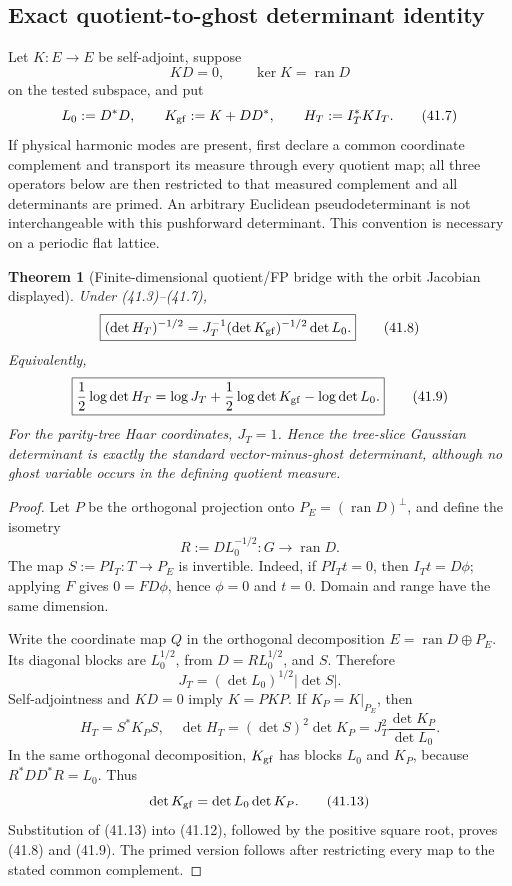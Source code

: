 \documentclass[11pt,oneside]{book}
\newtheorem{theorem}{Theorem}[chapter]
\theoremstyle{definition}
\theoremstyle{remark}
\begin{document}
\subsection{Exact quotient-to-ghost determinant identity}

Let \(K:E\to E\) be self-adjoint, suppose
\[
 KD=0,
 \qquad \ker K=\operatorname{ran}D                                \tag{41.6}
\]
on the tested subspace, and put
\[
 L_0:=D^*D,
 \qquad K_{\rm gf}:=K+DD^*,
 \qquad H_T:=I_T^*KI_T.                                          \tag{41.7}
\]
If physical harmonic modes are present, first declare a common
coordinate complement and transport its measure through every
quotient map; all three operators below are then restricted to that
measured complement and all determinants are primed.  An arbitrary
Euclidean pseudodeterminant is not interchangeable with this
pushforward determinant.  This convention is necessary on a periodic
flat lattice.

\begin{theorem}[Finite-dimensional quotient/FP bridge with the orbit
Jacobian displayed]
\label{thm:e8v41-quotient-FP}
Under (41.3)--(41.7),
\[
 \boxed{
 (\det H_T)^{-1/2}
 =J_T^{-1}(\det K_{\rm gf})^{-1/2}\det L_0.}                     \tag{41.8}
\]
Equivalently,
\[
 \boxed{
 \frac12\log\det H_T
 =\log J_T+\frac12\log\det K_{\rm gf}-\log\det L_0.}             \tag{41.9}
\]
For the parity-tree Haar coordinates, \(J_T=1\).  Hence the
tree-slice Gaussian determinant is exactly the standard
vector-minus-ghost determinant, although no ghost variable occurs in
the defining quotient measure.
\end{theorem}

\begin{proof}
Let \(P\) be the orthogonal projection onto
\(P_E=(\operatorname{ran}D)^\perp\), and define the isometry
\[
 R:=DL_0^{-1/2}:G\longrightarrow\operatorname{ran}D.             \tag{41.10}
\]
The map \(S:=PI_T:T\to P_E\) is invertible.  Indeed, if \(PI_Tt=0\),
then \(I_Tt=D\phi\); applying \(F\) gives \(0=FD\phi\), hence
\(\phi=0\) and \(t=0\).  Domain and range have the same dimension.

Write the coordinate map \(Q\) in the orthogonal decomposition
\(E=\operatorname{ran}D\oplus P_E\).  Its diagonal blocks are
\(L_0^{1/2}\), from \(D=RL_0^{1/2}\), and \(S\).  Therefore
\[
 J_T=(\det L_0)^{1/2}|\det S|.                                  \tag{41.11}
\]
Self-adjointness and \(KD=0\) imply \(K=PKP\).  If
\(K_P=K|_{P_E}\), then
\[
 H_T=S^*K_PS,
 \quad
 \det H_T=(\det S)^2\det K_P
 =J_T^2\frac{\det K_P}{\det L_0}.                               \tag{41.12}
\]
In the same orthogonal decomposition, \(K_{\rm gf}\) has blocks
\(L_0\) and \(K_P\), because \(R^*DD^*R=L_0\).  Thus
\[
 \det K_{\rm gf}=\det L_0\det K_P.                              \tag{41.13}
\]
Substitution of (41.13) into (41.12), followed by the positive
square root, proves (41.8) and (41.9).  The primed version follows
after restricting every map to the stated common complement.
\end{proof}
\end{document}
